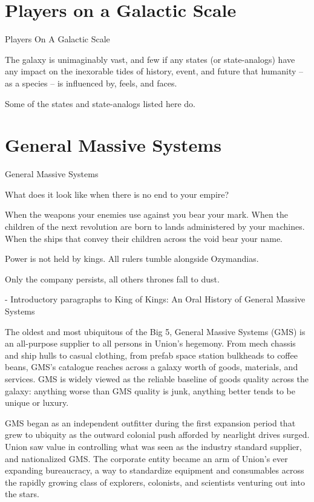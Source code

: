 \chapter{Players on a Galactic Scale}

Players On A Galactic Scale  

The galaxy is unimaginably vast, and few if any states (or state-analogs) have any  
impact on the inexorable tides of history, event, and future that humanity -- as a species -- is  
influenced by, feels, and faces.   

Some of the states and state-analogs listed here do.    
\chapter{General Massive Systems}
General Massive Systems  

         What does it look like when there is no end to your empire?   

         When the weapons your enemies use against you bear your mark. When the children of  
         the next revolution are born to lands administered by your machines. When the ships that  
         convey their children across the void bear your name.   

         Power is not held by kings. All rulers tumble alongside Ozymandias.   

         Only the company persists, all others thrones fall to dust.      

             -   Introductory paragraphs to King of Kings: An Oral History of General Massive  
                 Systems  

The oldest and most ubiquitous of the Big 5, General Massive Systems (GMS) is an all-purpose  
supplier to all persons in Union’s hegemony. From mech chassis and ship hulls to casual clothing,  
from prefab space station bulkheads to coffee beans, GMS’s catalogue reaches across a galaxy  
worth of goods, materials, and services. GMS is widely viewed as the reliable baseline of goods  
quality across the galaxy: anything worse than GMS quality is junk, anything better tends to be  
unique or luxury.   

GMS began as an independent outfitter during the first expansion period that grew to ubiquity as  
the outward colonial push afforded by nearlight drives surged. Union saw value in controlling what  
was seen as the industry standard supplier, and nationalized GMS. The corporate entity became  
an arm of Union’s ever expanding bureaucracy, a way to standardize equipment and  
consumables across the rapidly growing class of explorers, colonists, and scientists venturing out  
into the stars.   

